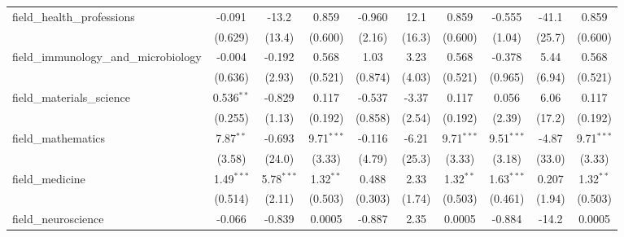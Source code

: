 \begin{tabular}{lccccccccc}
   field\_health\_professions                                  & -0.091         & -13.2          & 0.859          & -0.960         & 12.1          & 0.859          & -0.555         & -41.1          & 0.859\\   
                                                               & (0.629)        & (13.4)         & (0.600)        & (2.16)         & (16.3)        & (0.600)        & (1.04)         & (25.7)         & (0.600)\\   
   field\_immunology\_and\_microbiology                        & -0.004         & -0.192         & 0.568          & 1.03           & 3.23          & 0.568          & -0.378         & 5.44           & 0.568\\   
                                                               & (0.636)        & (2.93)         & (0.521)        & (0.874)        & (4.03)        & (0.521)        & (0.965)        & (6.94)         & (0.521)\\   
   field\_materials\_science                                   & 0.536$^{**}$   & -0.829         & 0.117          & -0.537         & -3.37         & 0.117          & 0.056          & 6.06           & 0.117\\   
                                                               & (0.255)        & (1.13)         & (0.192)        & (0.858)        & (2.54)        & (0.192)        & (2.39)         & (17.2)         & (0.192)\\   
   field\_mathematics                                          & 7.87$^{**}$    & -0.693         & 9.71$^{***}$   & -0.116         & -6.21         & 9.71$^{***}$   & 9.51$^{***}$   & -4.87          & 9.71$^{***}$\\   
                                                               & (3.58)         & (24.0)         & (3.33)         & (4.79)         & (25.3)        & (3.33)         & (3.18)         & (33.0)         & (3.33)\\   
   field\_medicine                                             & 1.49$^{***}$   & 5.78$^{***}$   & 1.32$^{**}$    & 0.488          & 2.33          & 1.32$^{**}$    & 1.63$^{***}$   & 0.207          & 1.32$^{**}$\\   
                                                               & (0.514)        & (2.11)         & (0.503)        & (0.303)        & (1.74)        & (0.503)        & (0.461)        & (1.94)         & (0.503)\\   
   field\_neuroscience                                         & -0.066         & -0.839         & 0.0005         & -0.887         & 2.35          & 0.0005         & -0.884         & -14.2          & 0.0005\\   

\end{tabular}
